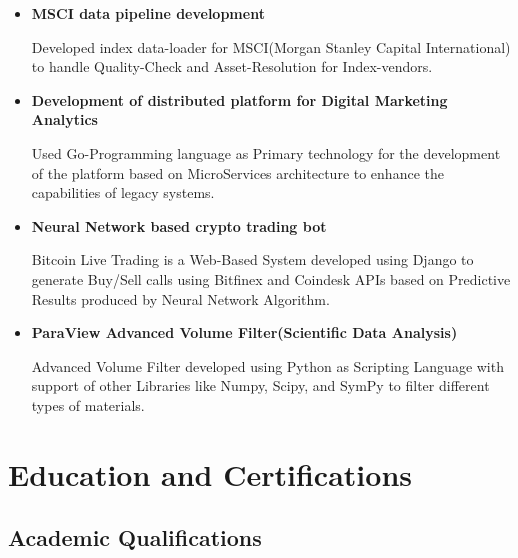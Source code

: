 \documentclass[11pt,a4paper,sans]{moderncv}        %
\begin{document}
{\begin{itemize}
\item{\textbf{MSCI data pipeline development} \textit{}

\vspace{3pt}

\small{Developed index data-loader for MSCI(Morgan Stanley Capital International) to handle Quality-Check and Asset-Resolution for Index-vendors.}}

\vspace{6pt}

\item{\textbf{Development of distributed platform for Digital Marketing Analytics} \textit{}

\vspace{3pt}

\small{Used Go-Programming language as Primary technology for the development of the platform based on MicroServices architecture to enhance the capabilities of legacy systems.}}

\vspace{6pt}
\item{\textbf{Neural Network based crypto trading bot}

\vspace{3pt}

\small{Bitcoin Live Trading is a Web-Based System developed using Django to generate Buy/Sell
calls using Bitfinex and Coindesk APIs based on Predictive Results produced by Neural Network Algorithm.}}

\vspace{6pt}

\item{\textbf{ParaView Advanced Volume Filter(Scientific Data Analysis)}

\vspace{3pt}

\small{Advanced Volume Filter developed using Python as Scripting Language
with support of other Libraries like Numpy, Scipy, and SymPy to filter different types of materials.}}

\end{itemize}

\section{Education and Certifications}

\vspace{5pt}

\subsection{Academic Qualifications}

}
\end{document}
